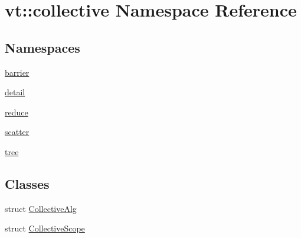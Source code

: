 \hypertarget{namespacevt_1_1collective}{}\section{vt\+:\+:collective Namespace Reference}
\label{namespacevt_1_1collective}
\subsection*{Namespaces}
\begin{DoxyCompactItemize}
\item 
 \hyperlink{namespacevt_1_1collective_1_1barrier}{barrier}
\item 
 \hyperlink{namespacevt_1_1collective_1_1detail}{detail}
\item 
 \hyperlink{namespacevt_1_1collective_1_1reduce}{reduce}
\item 
 \hyperlink{namespacevt_1_1collective_1_1scatter}{scatter}
\item 
 \hyperlink{namespacevt_1_1collective_1_1tree}{tree}
\end{DoxyCompactItemize}
\subsection*{Classes}
\begin{DoxyCompactItemize}
\item 
struct \hyperlink{structvt_1_1collective_1_1_collective_alg}{Collective\+Alg}
\item 
struct \hyperlink{structvt_1_1collective_1_1_collective_scope}{Collective\+Scope}
\end{DoxyCompactItemize}
